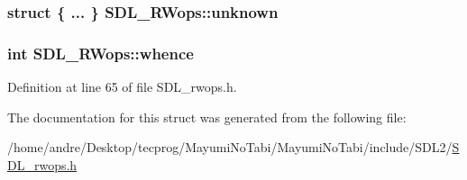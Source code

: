 \hypertarget{struct_s_d_l___r_wops_a731b73efaba3d5bdc1209ac9c01297a2}{
\subsubsection[{unknown}]{\setlength{\rightskip}{0pt plus 5cm}struct \{ ... \}   S\-D\-L\-\_\-\-R\-Wops\-::unknown}}\label{struct_s_d_l___r_wops_a731b73efaba3d5bdc1209ac9c01297a2}
\hypertarget{struct_s_d_l___r_wops_a95b96dcc6690897bfaf2d059f4378ed2}{
\subsubsection[{whence}]{ {\bf int} S\-D\-L\-\_\-\-R\-Wops\-::whence}}\label{struct_s_d_l___r_wops_a95b96dcc6690897bfaf2d059f4378ed2}


Definition at line 65 of file S\-D\-L\-\_\-rwops.\-h.



The documentation for this struct was generated from the following file\-:\begin{DoxyCompactItemize}
\item 
/home/andre/\-Desktop/tecprog/\-Mayumi\-No\-Tabi/\-Mayumi\-No\-Tabi/include/\-S\-D\-L2/\hyperlink{_s_d_l__rwops_8h}{S\-D\-L\-\_\-rwops.\-h}\end{DoxyCompactItemize}
